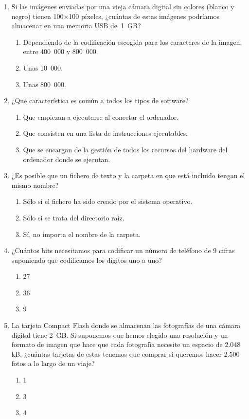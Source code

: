 \begin{enumerate}
\item Si las imágenes enviadas por una vieja cámara digital sin colores (blanco y negro) tienen 100$\times$100 píxeles, ¿cuántas de estas imágenes podríamos almacenar en una memoria USB de~1~GB? \begin{enumerate} \item Dependiendo de la codificación escogida para los caracteres de la imagen, entre 400~000 y 800~000. \item Unas 10~000. \item Unas 800~000. \end{enumerate} 

\item ¿Qué característica es común a todos los tipos de software? \begin{enumerate} \item Que empiezan a ejecutarse al conectar el ordenador. \item Que consisten en una lista de instrucciones ejecutables. \item Que se encargan de la gestión de todos los recursos del hardware del ordenador donde se ejecutan. \end{enumerate} 

\item ¿Es posible que un fichero de texto y la carpeta en que está incluido tengan el mismo nombre? \begin{enumerate} \item Sólo si el fichero ha sido creado por el sistema operativo. \item Sólo si se trata del directorio raíz. \item Sí, no importa el nombre de la carpeta. \end{enumerate} 

\item ¿Cuántos bits necesitamos para codificar un número de teléfono de 9 cifras suponiendo que codificamos los dígitos uno a uno? \begin{enumerate} \item 27 \item 36 \item 9 \end{enumerate} 

\item La tarjeta Compact Flash donde se almacenan las fotografías de una cámara digital tiene 2~GB. Si suponemos que hemos elegido una resolución y un formato de imagen que hace que cada fotografía necesite un espacio de 2.048 kB, ¿cuántas tarjetas de estas tenemos que comprar si queremos hacer 2.500 fotos a lo largo de un viaje? \begin{enumerate} \item 1 \item 3 \item 4 \end{enumerate} 


\end{enumerate}
